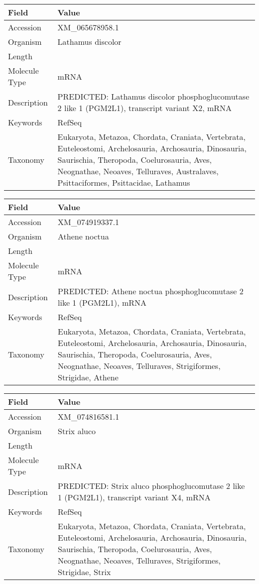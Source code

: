 \documentclass[10pt]{article}
\begin{document}
\vspace{1em}
{\footnotesize
\begin{longtable}{>{\raggedright\arraybackslash}p{4.5cm} >{\raggedright\arraybackslash}p{11.5cm}}
\textbf{Field} & \textbf{Value} \\
\hline
Accession & XM\_065678958.1 \\
Organism & Lathamus discolor \\
Length & 6310 \\
Molecule Type & mRNA \\
Description & PREDICTED: Lathamus discolor phosphoglucomutase 2 like 1 (PGM2L1), transcript variant X2, mRNA \\
Keywords & RefSeq \\
Taxonomy & Eukaryota, Metazoa, Chordata, Craniata, Vertebrata, Euteleostomi, Archelosauria, Archosauria, Dinosauria, Saurischia, Theropoda, Coelurosauria, Aves, Neognathae, Neoaves, Telluraves, Australaves, Psittaciformes, Psittacidae, Lathamus \\
\end{longtable}
}

\vspace{1em}
{\footnotesize
\begin{longtable}{>{\raggedright\arraybackslash}p{4.5cm} >{\raggedright\arraybackslash}p{11.5cm}}
\textbf{Field} & \textbf{Value} \\
\hline
Accession & XM\_074919337.1 \\
Organism & Athene noctua \\
Length & 2966 \\
Molecule Type & mRNA \\
Description & PREDICTED: Athene noctua phosphoglucomutase 2 like 1 (PGM2L1), mRNA \\
Keywords & RefSeq \\
Taxonomy & Eukaryota, Metazoa, Chordata, Craniata, Vertebrata, Euteleostomi, Archelosauria, Archosauria, Dinosauria, Saurischia, Theropoda, Coelurosauria, Aves, Neognathae, Neoaves, Telluraves, Strigiformes, Strigidae, Athene \\
\end{longtable}
}

\vspace{1em}
{\footnotesize
\begin{longtable}{>{\raggedright\arraybackslash}p{4.5cm} >{\raggedright\arraybackslash}p{11.5cm}}
\textbf{Field} & \textbf{Value} \\
\hline
Accession & XM\_074816581.1 \\
Organism & Strix aluco \\
Length & 6322 \\
Molecule Type & mRNA \\
Description & PREDICTED: Strix aluco phosphoglucomutase 2 like 1 (PGM2L1), transcript variant X4, mRNA \\
Keywords & RefSeq \\
Taxonomy & Eukaryota, Metazoa, Chordata, Craniata, Vertebrata, Euteleostomi, Archelosauria, Archosauria, Dinosauria, Saurischia, Theropoda, Coelurosauria, Aves, Neognathae, Neoaves, Telluraves, Strigiformes, Strigidae, Strix \\
\end{longtable}
}
\end{document}
